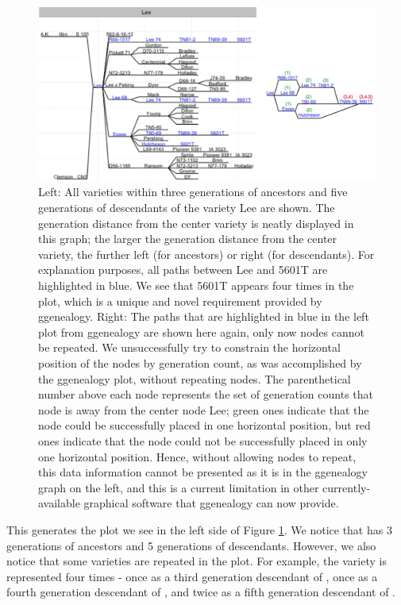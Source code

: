 \documentclass[article,shortnames]{jss}
\begin{document}
\begin{figure}%
    \centering
    \includegraphics[width=\textwidth]{Lee}
    \caption{Left: All varieties within three generations of ancestors and five generations of descendants of the variety Lee are shown. The generation distance from the center variety is neatly displayed in this graph; the larger the generation distance from the center variety, the further left (for ancestors) or right (for descendants). For explanation purposes, all paths between Lee and 5601T are highlighted in blue. We see that 5601T appears four times in the plot, which is a unique and novel requirement provided by ggenealogy. Right: The paths that are highlighted in blue in the left plot from ggenealogy are shown here again, only now nodes cannot be repeated. We unsuccessfully try to constrain the horizontal position of the nodes by generation count, as was accomplished by the ggenealogy plot, without repeating nodes. The parenthetical number above each node represents the set of generation counts that node is away from the center node Lee; green ones indicate that the node could be successfully placed in one horizontal position, but red ones indicate that the node could not be successfully placed in only one horizontal position. Hence, without allowing nodes to repeat, this data information cannot be presented as it is in the ggenealogy graph on the left, and this is a current limitation in other currently-available graphical software that ggenealogy can now provide.}
    \label{fig:Lee}
\end{figure}

This generates the plot we see in the left side of Figure \ref{fig:Lee}. We notice that  has 3 generations of ancestors and 5 generations of descendants. However, we also notice that some varieties are repeated in the plot. For example, the variety  is represented four times - once as a third generation descendant of , once as a fourth generation descendant of , and twice as a fifth generation descendant of .
\end{document}
